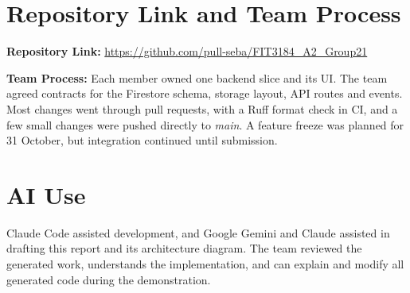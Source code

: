 \documentclass[12pt,a4paper]{article}
\newcommand{\code}[1]{\textit{#1}} %
\begin{document}
\section{Repository Link and Team Process}

\textbf{Repository Link:} \url{https://github.com/pull-seba/FIT3184_A2_Group21}

\textbf{Team Process:} Each member owned one backend slice and its UI. The team agreed contracts for the Firestore schema, storage layout, API routes and events. Most changes went through pull requests, with a Ruff format check in CI, and a few small changes were pushed directly to \code{main}. A feature freeze was planned for 31 October, but integration continued until submission.

\section{AI Use}

Claude Code assisted development, and Google Gemini and Claude assisted in drafting this report and its architecture diagram. The team reviewed the generated work, understands the implementation, and can explain and modify all generated code during the demonstration.
\end{document}
